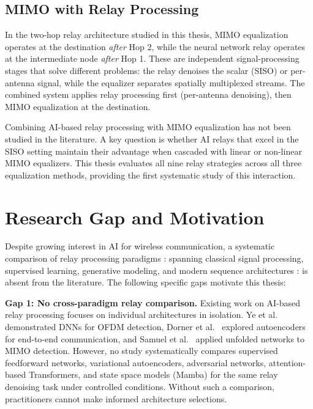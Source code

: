 \subsection{MIMO with Relay Processing}\label{sec:mimo-with-relay-processing}

In the two-hop relay architecture studied in this thesis, MIMO equalization operates at the destination \emph{after} Hop 2, while the neural network relay operates at the intermediate node \emph{after} Hop 1. These are independent signal-processing stages that solve different problems: the relay denoises the scalar (SISO) or per-antenna signal, while the equalizer separates spatially multiplexed streams. The combined system applies relay processing first (per-antenna denoising), then MIMO equalization at the destination.

Combining AI-based relay processing with MIMO equalization has not been studied in the literature. A key question is whether AI relays that excel in the SISO setting maintain their advantage when cascaded with linear or non-linear MIMO equalizers. This thesis evaluates all nine relay strategies across all three equalization methods, providing the first systematic study of this interaction.

\section{Research Gap and Motivation}\label{sec:research-gap-and-motivation}

Despite growing interest in AI for wireless communication, a systematic comparison of relay processing paradigms : spanning classical signal processing, supervised learning, generative modeling, and modern sequence architectures : is absent from the literature. The following specific gaps motivate this thesis:

\textbf{Gap 1: No cross-paradigm relay comparison.} Existing work on AI-based relay processing focuses on individual architectures in isolation. Ye et al.~\cite{YeLiJuang2018OFDMDL} demonstrated DNNs for OFDM detection, Dorner et al.~\cite{Dorner2018OverTheAirDL} explored autoencoders for end-to-end communication, and Samuel et al.~\cite{SamuelDiskinWunder2019MIMODetect} applied unfolded networks to MIMO detection. However, no study systematically compares supervised feedforward networks, variational autoencoders, adversarial networks, attention-based Transformers, and state space models (Mamba) for the same relay denoising task under controlled conditions. Without such a comparison, practitioners cannot make informed architecture selections.

